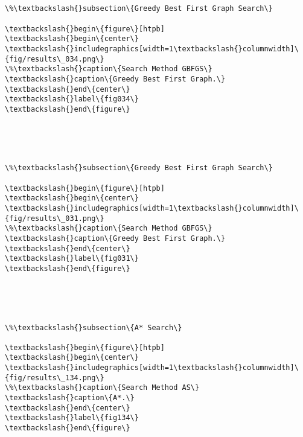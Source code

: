\documentclass[11pt]{article}
\begin{document}
    \begin{center}
    \end{center}
    { \hspace*{\fill} \\}
    
    \begin{Verbatim}[commandchars=\\\{\}]

\%\textbackslash{}subsection\{Greedy Best First Graph Search\}

\textbackslash{}begin\{figure\}[htpb]
\textbackslash{}begin\{center\}
\textbackslash{}includegraphics[width=1\textbackslash{}columnwidth]\{fig/results\_034.png\}
\%\textbackslash{}caption\{Search Method GBFGS\}
\textbackslash{}caption\{Greedy Best First Graph.\}
\textbackslash{}end\{center\}
\textbackslash{}label\{fig034\}
\textbackslash{}end\{figure\}
        

    \end{Verbatim}

    \begin{center}
    \end{center}
    { \hspace*{\fill} \\}
    
    \begin{Verbatim}[commandchars=\\\{\}]

\%\textbackslash{}subsection\{Greedy Best First Graph Search\}

\textbackslash{}begin\{figure\}[htpb]
\textbackslash{}begin\{center\}
\textbackslash{}includegraphics[width=1\textbackslash{}columnwidth]\{fig/results\_031.png\}
\%\textbackslash{}caption\{Search Method GBFGS\}
\textbackslash{}caption\{Greedy Best First Graph.\}
\textbackslash{}end\{center\}
\textbackslash{}label\{fig031\}
\textbackslash{}end\{figure\}
        

    \end{Verbatim}

    \begin{center}
    \end{center}
    { \hspace*{\fill} \\}
    
    \begin{Verbatim}[commandchars=\\\{\}]

\%\textbackslash{}subsection\{A* Search\}

\textbackslash{}begin\{figure\}[htpb]
\textbackslash{}begin\{center\}
\textbackslash{}includegraphics[width=1\textbackslash{}columnwidth]\{fig/results\_134.png\}
\%\textbackslash{}caption\{Search Method AS\}
\textbackslash{}caption\{A*.\}
\textbackslash{}end\{center\}
\textbackslash{}label\{fig134\}
\textbackslash{}end\{figure\}
        

    \end{Verbatim}
\end{document}
